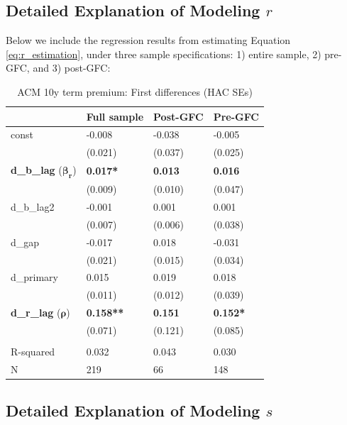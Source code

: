 \documentclass[12pt]{article}
\begin{document}
\subsection{Detailed Explanation of Modeling $r$}
\label{sec:detailed_explanation_r}

Below we include the regression results from estimating Equation \ref{eq:r_estimation}, under three sample specifications: 1) entire sample, 2) pre-GFC, and 3) post-GFC:
\begin{table}
\begin{center}
\begin{tabular}{llll}
\hline
               & Full sample & Post-GFC & Pre-GFC  \\
\hline
const          & -0.008      & -0.038   & -0.005   \\
               & (0.021)     & (0.037)  & (0.025)  \\
\textbf{d\_b\_lag} ($\mathbf{\beta_r}$)      & \textbf{0.017*}      & \textbf{0.013}    &  \textbf{0.016}    \\
               & (0.009)     & (0.010)  & (0.047)  \\
d\_b\_lag2     & -0.001      & 0.001    & 0.001    \\
               & (0.007)     & (0.006)  & (0.038)  \\
d\_gap         & -0.017      & 0.018    & -0.031   \\
               & (0.021)     & (0.015)  & (0.034)  \\
d\_primary     & 0.015       & 0.019    & 0.018    \\
               & (0.011)     & (0.012)  & (0.039)  \\
\textbf{d\_r\_lag} ($\mathbf{\rho}$)     & \textbf{0.158**}     & \textbf{0.151}    &  \textbf{0.152*}   \\
               & (0.071)     & (0.121)  & (0.085)  \\
               \hline \\
R-squared      & 0.032       & 0.043    & 0.030    \\
N              & 219         & 66       & 148      \\
\hline
\end{tabular}
\caption{ACM 10y term premium: First differences (HAC SEs)}
\label{tab:r_estimation_results}
\end{center}
\end{table}

\subsection{Detailed Explanation of Modeling $s$}
\label{sec:detailed_explanation_s}
\end{document}
